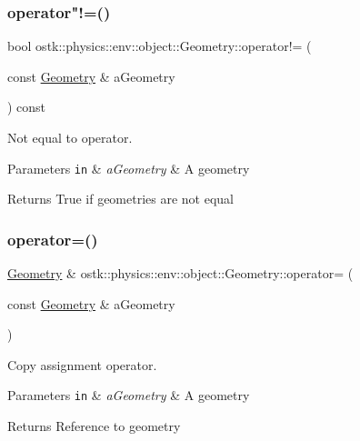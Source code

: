 \subsubsection{\texorpdfstring{operator"!=()}{operator!=()}}
{\footnotesize\ttfamily bool ostk\+::physics\+::env\+::object\+::\+Geometry\+::operator!= (\begin{DoxyParamCaption}\item[{const \hyperlink{classostk_1_1physics_1_1env_1_1object_1_1_geometry}{Geometry} \&}]{a\+Geometry }\end{DoxyParamCaption}) const}



Not equal to operator. 


\begin{DoxyParams}[1]{Parameters}
\mbox{\tt in}  & {\em a\+Geometry} & A geometry \\
\hline
\end{DoxyParams}
\begin{DoxyReturn}{Returns}
True if geometries are not equal 
\end{DoxyReturn}
\mbox{\label{classostk_1_1physics_1_1env_1_1object_1_1_geometry_a777d72a587112d74bad356180f75b6d0}} 
\subsubsection{\texorpdfstring{operator=()}{operator=()}}
{\footnotesize\ttfamily \hyperlink{classostk_1_1physics_1_1env_1_1object_1_1_geometry}{Geometry} \& ostk\+::physics\+::env\+::object\+::\+Geometry\+::operator= (\begin{DoxyParamCaption}\item[{const \hyperlink{classostk_1_1physics_1_1env_1_1object_1_1_geometry}{Geometry} \&}]{a\+Geometry }\end{DoxyParamCaption})}



Copy assignment operator. 


\begin{DoxyParams}[1]{Parameters}
\mbox{\tt in}  & {\em a\+Geometry} & A geometry \\
\hline
\end{DoxyParams}
\begin{DoxyReturn}{Returns}
Reference to geometry 
\end{DoxyReturn}
\mbox{\label{classostk_1_1physics_1_1env_1_1object_1_1_geometry_aa3d15f7a766995279b88ad7fdc2befe1}} 
